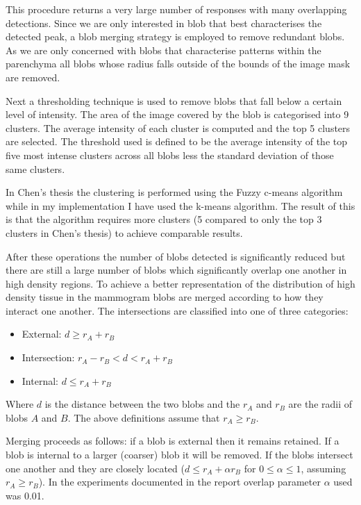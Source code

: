 This procedure returns a very large number of responses with many overlapping detections. Since we are only interested in blob that best characterises the detected peak, a blob merging strategy is employed to remove redundant blobs. As we are only concerned with blobs that characterise patterns within the parenchyma all blobs whose radius falls outside of the bounds of the image mask are removed. 

Next a thresholding technique is used to remove blobs that fall below a certain level of intensity. The area of the image covered by the blob is categorised into 9 clusters. The average intensity of each cluster is computed and the top 5 clusters are selected. The threshold used is defined to be the average intensity of the top five most intense clusters across all blobs less the standard deviation of those same clusters. 

In Chen's thesis the clustering is performed using the Fuzzy c-means algorithm while in my implementation I have used the k-means algorithm. The result of this is that the algorithm requires more clusters (5 compared to only the top 3 clusters in Chen's thesis) to achieve comparable results.

After these operations the number of blobs detected is significantly reduced but there are still a large number of blobs which significantly overlap one another in high density regions. To achieve a better representation of the distribution of high density tissue in the mammogram blobs are merged according to how they interact one another. The intersections are classified into one of three categories:

\begin{itemize}
	\item External: $d \geq r_A + r_B$
	\item Intersection: $r_A - r_B < d < r_A + r_B$
	\item Internal: $d \leq r_A + r_B$
\end{itemize}

Where $d$ is the distance between the two blobs and the $r_A$ and $r_B$ are the radii of blobs $A$ and $B$. The above definitions assume that $r_A \geq r_B$.

Merging proceeds as follows: if a blob is external then it remains retained. If a blob is internal to a larger (coarser) blob it will be removed. If the blobs intersect one another and they are closely located ($d \leq r_A + \alpha r_B$ for $0 \leq \alpha \leq 1$, assuming $r_A \geq r_B$). In the experiments documented in the report overlap parameter $\alpha$ used was 0.01. 

